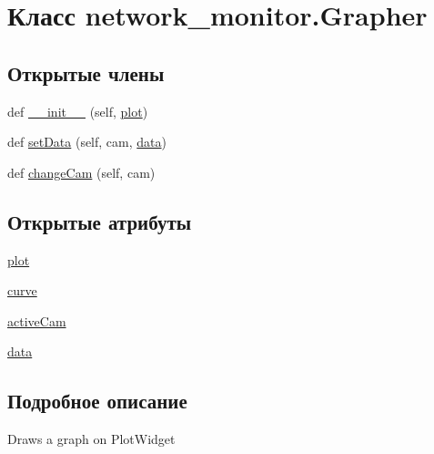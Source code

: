 \hypertarget{classnetwork__monitor_1_1_grapher}{}\section{Класс network\+\_\+monitor.\+Grapher}
\label{classnetwork__monitor_1_1_grapher}
\subsection*{Открытые члены}
\begin{DoxyCompactItemize}
\item 
def \hyperlink{classnetwork__monitor_1_1_grapher_a51113dd8de2a23b04c7d21e05443a254}{\+\_\+\+\_\+init\+\_\+\+\_\+} (self, \hyperlink{classnetwork__monitor_1_1_grapher_a3ebf5396c625164b8ef6477aeabfcd2d}{plot})
\item 
def \hyperlink{classnetwork__monitor_1_1_grapher_a6eb6ea6a4d6c3759f8182fdf07432cb5}{set\+Data} (self, cam, \hyperlink{classnetwork__monitor_1_1_grapher_aa4de1f707991945eff5ad4836ace2369}{data})
\item 
def \hyperlink{classnetwork__monitor_1_1_grapher_a424bf8aa9aead01ea95c2a52744dfb37}{change\+Cam} (self, cam)
\end{DoxyCompactItemize}
\subsection*{Открытые атрибуты}
\begin{DoxyCompactItemize}
\item 
\hyperlink{classnetwork__monitor_1_1_grapher_a3ebf5396c625164b8ef6477aeabfcd2d}{plot}
\item 
\hyperlink{classnetwork__monitor_1_1_grapher_ac014cfb815646074bf97e975af0ed774}{curve}
\item 
\hyperlink{classnetwork__monitor_1_1_grapher_a423a9b2f9d50d5fff7a12eaa81cbc4ad}{active\+Cam}
\item 
\hyperlink{classnetwork__monitor_1_1_grapher_aa4de1f707991945eff5ad4836ace2369}{data}
\end{DoxyCompactItemize}


\subsection{Подробное описание}
\begin{DoxyVerb}Draws a graph on PlotWidget\end{DoxyVerb}
 

